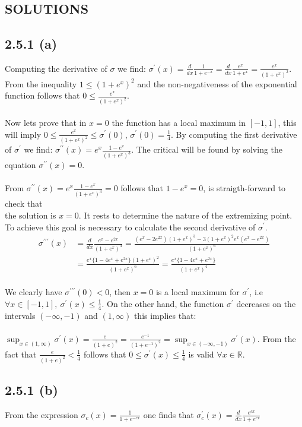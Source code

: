 \documentclass{exam}
\begin{document}
\newpage

\begin{center}    
    \section*{SOLUTIONS}
\end{center}

\subsection*{2.5.1 (a)}
Computing the derivative of $\sigma$ we find: $\sigma^\prime(x) = \frac{d}{dx} \frac{1}{ 1 + e^{-x}} = \frac{d}{dx} \frac{e^x}{ 1 + e^{x}} = \frac{e^x}{(1 + e^{x})^2}$. From the inequality $1 \leq (1+e^x)^2$ and the non-negativeness of the exponential function follows that 
$0 \leq \frac{e^x}{(1 + e^{x})^2}$. \\
\\
Now lets prove that in $x=0$ the function has a local maximum in $[-1,1]$, this will imply $0 \leq \frac{e^x}{(1 + e^{x})^2} \leq \sigma^\prime(0)$, $\sigma^\prime(0) = \frac{1}{4}$. By computing the first derivative of $\sigma^\prime$ we find: 
$\sigma^{\prime\prime}(x) = e^{x}\frac{1-e^{x}}{(1 + e^{x})^3}$. The critical will be found by solving the equation $\sigma^{\prime\prime}(x) = 0$. \\
\\
From $\sigma^{\prime\prime}(x) = e^{x}\frac{1-e^{x}}{(1 + e^{x})^3} = 0$ follows that $1 - e^x = 0$, is straigth-forward to check that \\
the solution is $x=0$. It rests to determine the nature of the extremizing point. To achieve this goal is necessary to calculate the second derivative of $\sigma^{\prime}$.
\begin{equation*}     
        \begin{aligned}
            \sigma^{\prime\prime\prime}(x) &= \frac{d}{ d x} \frac{e^{x}-e^{2x}}{(1 + e^{x})^3} = \frac{(e^x - 2e^{2x})(1 + e^x)^3 - 3(1 + e^x)^2 e^{x}(e^x - e^{2x})}{(1 + e^x)^6}\\
            &= \frac{e^{x} \{ 1 - 4e^x + e^{2x} \}(1 + e^x)^2}{(1 + e^x)^{6}} = \frac{e^{x} \{ 1 - 4e^x + e^{2x} \}}{(1 + e^x)^{4}}
        \end{aligned}
\end{equation*}
\\
We clearly have $\sigma^{\prime\prime\prime}(0) < 0$, then $x = 0$ is a local maximum for $\sigma^\prime$, i.e $\forall x \in [-1, 1], \ \sigma^\prime(x) \leq \frac{1}{4}$. On the other hand,
the function $\sigma^\prime$ decreases on the intervals $(-\infty,-1)$ and $(1, \infty)$ this implies that:\\
\\
$\displaystyle\sup_{x \in (1,\infty)}\sigma^{\prime}(x) = \displaystyle\frac{e}{(1 + e)^2} = \displaystyle\frac{e^{-1}}{(1 + e^{-1})^2} = \sup_{x \in (-\infty,-1)} \sigma^{\prime}(x)$.
From the fact that $\displaystyle\frac{e}{(1 + e)^2} < \frac{1}{4}$ follows that $ 0 \leq \sigma^\prime(x) \leq \frac{1}{4}$ is valid $\forall x \in \mathbb{R}$. 

\subsection*{2.5.1 (b)}
From the expression $\sigma_c(x) = \frac{1}{1 + e^{-cx}}$ one finds that $\sigma^{\prime}_c(x) = \frac{d}{d x} \frac{e^{cx}}{1 + e^{cx}}$
\end{document}
